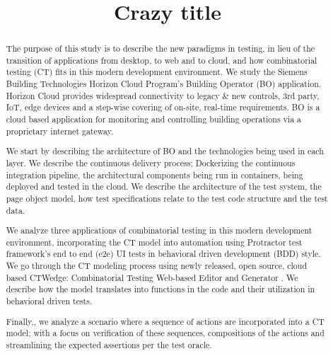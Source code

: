 \documentclass[conference]{IEEEtran}
\begin{document}
\title{Crazy title}


\author{
}

\maketitle


\begin{abstract}
The purpose of this study is to describe the new paradigms in testing,
in lieu of the transition of applications from desktop, to web and to cloud, and how combinatorial testing (CT) fits in this modern development environment. 
We study the Siemens Building Technologies Horizon Cloud Program's Building Operator (BO) application.
Horizon Cloud provides widespread connectivity to legacy \& new controls, 3rd party, IoT, edge devices and a step-wise covering of on-site, real-time requirements. 
BO is a cloud based application for monitoring and controlling building operations via a proprietary internet gateway.

We start by describing the architecture of BO and the technologies being used in each layer. 
We describe the continuous delivery process; Dockerizing \cite{wiki:docker} the continuous integration pipeline,
the architectural components being run in containers, being deployed and tested in the cloud. 
We describe the architecture of the test system, the page object model, how test specifications relate to the test code structure and the test data. 

We analyze three applications of combinatorial testing in this modern development environment,
incorporating the CT model into automation using Protractor test framework's end to end (e2e) UI tests in behavioral driven development (BDD) style. 
We go through the CT modeling process using newly released, open source, cloud based CTWedge: Combinatorial Testing Web-based Editor and Generator \cite{gargantini2018migrating}. 
We describe how the model translates into functions in the code and their utilization in behavioral driven tests.

Finally,, we analyze a scenario where a sequence of actions are incorporated into a CT model;
with a focus on verification of these sequences, compositions of the actions and streamlining the expected assertions per the test oracle.

\end{abstract}
\end{document}
